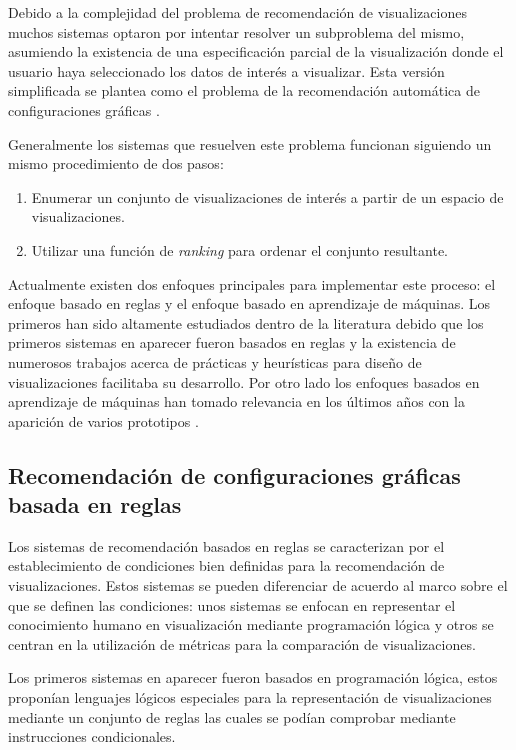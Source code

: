 Debido a la complejidad del problema de recomendaci\'on de visualizaciones muchos
sistemas optaron por intentar resolver un subproblema del mismo,
asumiendo la existencia de una especificaci\'on parcial de la visualizaci\'on donde el usuario haya seleccionado
los datos de inter\'es a visualizar. Esta versi\'on simplificada se plantea como el problema de la
recomendaci\'on autom\'atica de configuraciones gr\'aficas \cite{qin2020making}.

Generalmente los sistemas que resuelven este problema funcionan siguiendo un mismo procedimiento de dos pasos:
\begin{enumerate}
    \item Enumerar un conjunto de visualizaciones de inter\'es a partir de un espacio de visualizaciones.
    \item Utilizar una funci\'on de \textit{ranking} para ordenar el conjunto resultante.
\end{enumerate}

Actualmente existen dos enfoques principales para implementar este proceso: el enfoque basado en reglas
y el enfoque basado en aprendizaje de m\'aquinas. Los primeros han sido altamente estudiados dentro de la 
literatura debido que los primeros sistemas en aparecer fueron basados en reglas y la existencia
de numerosos trabajos acerca de pr\'acticas y heur\'isticas para dise\~no de visualizaciones facilitaba su desarrollo.
Por otro lado los enfoques basados en aprendizaje de m\'aquinas han tomado relevancia en los \'ultimos a\~nos con la aparici\'on
de varios prototipos \cite{zeng2021we}.

\subsection{Recomendaci\'on de configuraciones gr\'aficas basada en reglas} \label{subsection:rule-viz-rec}

Los sistemas de recomendaci\'on basados en reglas se caracterizan por el establecimiento
de condiciones bien definidas para la recomendaci\'on de visualizaciones. Estos sistemas
se pueden diferenciar de acuerdo al marco sobre el que se definen las condiciones: unos sistemas
se enfocan en representar el conocimiento humano en visualizaci\'on mediante programaci\'on l\'ogica y 
otros se centran en la utilizaci\'on de m\'etricas para la comparaci\'on de visualizaciones.

Los primeros sistemas en aparecer fueron basados en programaci\'on l\'ogica, estos propon\'ian lenguajes
l\'ogicos especiales para la representaci\'on de visualizaciones mediante un conjunto de reglas las cuales
se pod\'ian comprobar mediante instrucciones condicionales.

